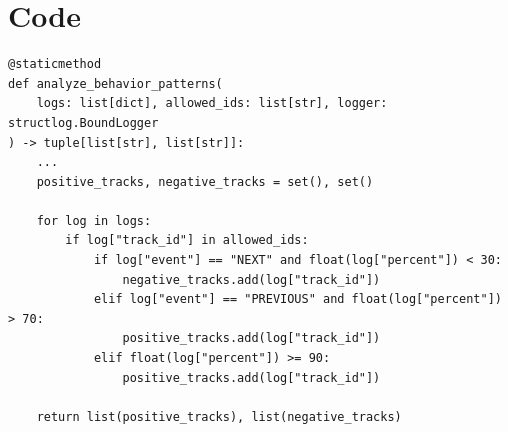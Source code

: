 \documentclass{pwrReport} %
\begin{document}
    \section{Code}
\begin{lstlisting}
@staticmethod
def analyze_behavior_patterns(
    logs: list[dict], allowed_ids: list[str], logger: structlog.BoundLogger
) -> tuple[list[str], list[str]]:
    ...
    positive_tracks, negative_tracks = set(), set()

    for log in logs:
        if log["track_id"] in allowed_ids:
            if log["event"] == "NEXT" and float(log["percent"]) < 30:
                negative_tracks.add(log["track_id"])
            elif log["event"] == "PREVIOUS" and float(log["percent"]) > 70:
                positive_tracks.add(log["track_id"])
            elif float(log["percent"]) >= 90:
                positive_tracks.add(log["track_id"])

    return list(positive_tracks), list(negative_tracks)
\end{lstlisting}




\end{document}
